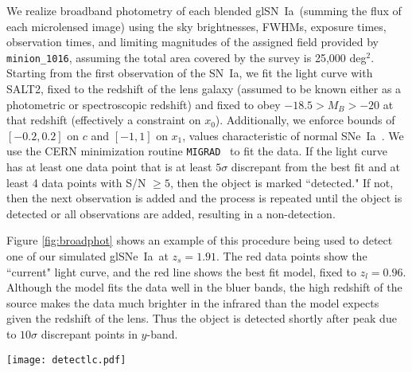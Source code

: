 \documentclass[iop,apj,numberedappendix,twocolappendix]{emulateapj}
\newcommand{\snia}{{\rm SN~Ia}}
\newcommand{\sneia}{{\rm SNe~Ia}}
\begin{document}
We realize broadband photometry of each blended gl\snia\ (summing the flux of each microlensed image) using the sky brightnesses, FWHMs, exposure times, observation times, and limiting magnitudes of the assigned field provided by \texttt{minion\_1016}, assuming the total area covered by the survey is 25,000 deg$^2$.
Starting from the first observation of the \snia, we fit the light curve with SALT2, fixed to the redshift of the lens galaxy (assumed to be known either as a photometric or spectroscopic redshift) and fixed to obey $-18.5 > M_B > -20$ at that redshift (effectively a constraint on $x_0$).
Additionally, we enforce bounds of $[-0.2, 0.2]$ on $c$ and $[-1, 1]$ on $x_1$, values characteristic of normal \sneia\ \citep{scalzo14a}.
We use the CERN minimization routine \texttt{MIGRAD}\ \citep{minuit} to fit the data.
If the light curve has at least one data point that is at least $5\sigma$ discrepant from the best fit and at least 4 data points with S/N $\geq 5$, then the object is marked ``detected."
If not, then the next observation is added and the process is repeated until the object is detected or all observations are added, resulting in a non-detection.

Figure \ref{fig:broadphot} shows an example of this procedure being used to detect one of our simulated gl\sneia\ at $z_s=1.91$.
The red data points show the ``current" light curve, and the red line shows the best fit model, fixed to $z_l=0.96$. 
Although the model fits the data well in the bluer bands, the high redshift of the source makes the data much brighter in the infrared than the model expects given the redshift of the lens.
Thus the object is detected shortly after peak due to $10\sigma$ discrepant points in $y$-band.


\begin{figure*}
	\centering
    \texttt{[image: detectlc.pdf]}
    \caption{Detecting a $z_s=1.91, z_l=0.96$ LSST gl\snia\ with SALT2.
    The red data points show the ``current" light curve, and the red line shows the best fit SALT2 model fixed to the photometric redshift of the lens galaxy. 
    The gray points show future observations that are not included in this iteration of the fit.
    The black vertical line in the residual plots shows the date when the supernova is detected.
    Although the model fits the data well in the bluer bands, the high redshift of the source makes the data much brighter in the infrared than the model expects given the redshift of the lens.
Thus the object is detected shortly after peak due to $10\sigma$ discrepant points in $y$-band.}
    \label{fig:broadphot}
\end{figure*}
\end{document}
